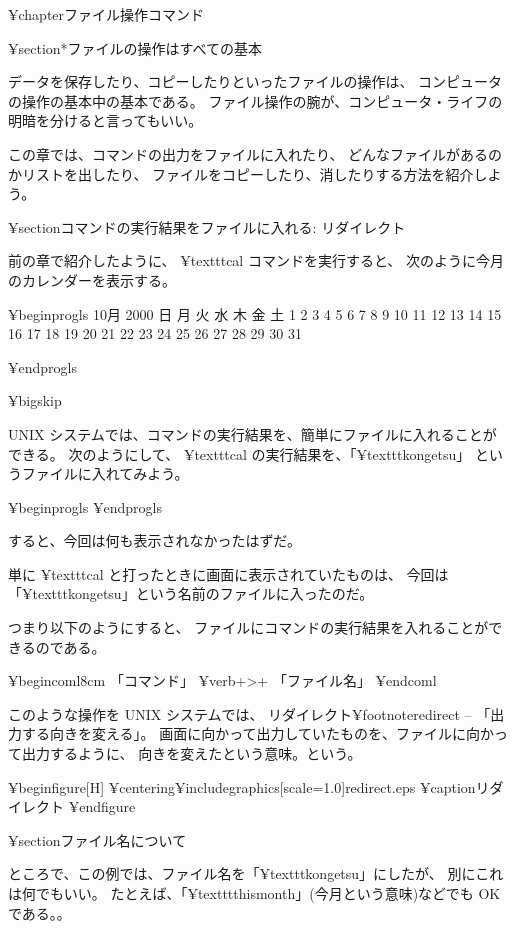 ¥chapter{ファイル操作コマンド}

¥section*{ファイルの操作はすべての基本}

データを保存したり、コピーしたりといったファイルの操作は、
コンピュータの操作の基本中の基本である。
ファイル操作の腕が、コンピュータ・ライフの明暗を分けると言ってもいい。

この章では、コマンドの出力をファイルに入れたり、
どんなファイルがあるのかリストを出したり、
ファイルをコピーしたり、消したりする方法を紹介しよう。

¥section{コマンドの実行結果をファイルに入れる: リダイレクト}

前の章で紹介したように、 ¥texttt{cal} コマンドを実行すると、
次のように今月のカレンダーを表示する。

¥begin{progls}
     10月 2000
日 月 火 水 木 金 土
 1  2  3  4  5  6  7
 8  9 10 11 12 13 14
15 16 17 18 19 20 21
22 23 24 25 26 27 28
29 30 31

%
¥end{progls}

¥bigskip

 UNIX システムでは、コマンドの実行結果を、簡単にファイルに入れることが
できる。
次のようにして、 ¥texttt{cal} の実行結果を、「¥texttt{kongetsu}」
というファイルに入れてみよう。

¥begin{progls}
%
¥end{progls}

すると、今回は何も表示されなかったはずだ。

単に ¥texttt{cal} と打ったときに画面に表示されていたものは、
今回は「¥texttt{kongetsu}」という名前のファイルに入ったのだ。


つまり以下のようにすると、
ファイルにコマンドの実行結果を入れることができるのである。

¥begin{coml}{8cm}
「コマンド」 ¥verb+>+ 「ファイル名」
¥end{coml}

このような操作を UNIX システムでは、
リダイレクト¥footnote{redirect -- 「出力する向きを変える」。
画面に向かって出力していたものを、ファイルに向かって出力するように、
向きを変えたという意味。}という。

¥begin{figure}[H]
¥centering{¥includegraphics[scale=1.0]{redirect.eps}}
¥caption{リダイレクト}
¥end{figure}

¥section{ファイル名について}

ところで、この例では、ファイル名を「¥texttt{kongetsu}」にしたが、
別にこれは何でもいい。
たとえば、「¥texttt{thismonth}」(今月という意味)などでも OK である。。


